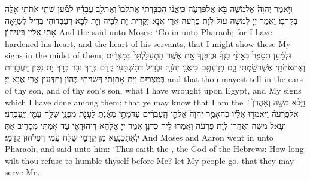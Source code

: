 \newperek
{}
{וַיֹּ֤אמֶר יְהֹוָה֙ אֶל\maqqaf מֹשֶׁ֔ה בֹּ֖א אֶל\maqqaf פַּרְעֹ֑ה כִּֽי\maqqaf אֲנִ֞י הִכְבַּ֤דְתִּי אֶת\maqqaf לִבּוֹ֙ וְאֶת\maqqaf לֵ֣ב עֲבָדָ֔יו לְמַ֗עַן שִׁתִ֛י אֹתֹתַ֥י אֵ֖לֶּה בְּקִרְבּֽוֹ׃}
{וַאֲמַר יְיָ לְמֹשֶׁה עוֹל לְוָת פַּרְעֹה אֲרֵי אֲנָא יַקַּרִית יָת לִבֵּיהּ וְיָת לִבָּא דְּעַבְדּוֹהִי בְּדִיל לְשַׁוָּאָה אָתַי אִלֵּין בֵּינֵיהוֹן׃}
{And the \lord\space said unto Moses: ‘Go in unto Pharaoh; for I have hardened his heart, and the heart of his servants, that I might show these My signs in the midst of them;}{}
{וּלְמַ֡עַן תְּסַפֵּר֩ בְּאׇזְנֵ֨י בִנְךָ֜ וּבֶן\maqqaf בִּנְךָ֗ אֵ֣ת אֲשֶׁ֤ר הִתְעַלַּ֙לְתִּי֙ בְּמִצְרַ֔יִם וְאֶת\maqqaf אֹתֹתַ֖י אֲשֶׁר\maqqaf שַׂ֣מְתִּי בָ֑ם וִֽידַעְתֶּ֖ם כִּי\maqqaf אֲנִ֥י יְהֹוָֽה׃}
{וּבְדִיל דְּתִשְׁתַּעֵי קֳדָם בְּרָךְ וּבַר בְּרָךְ יָת נִסִּין דַּעֲבַדִית בְּמִצְרַיִם וְיָת אָתְוָתַי דְּשַׁוִּיתִי בְּהוֹן וְתִדְּעוּן אֲרֵי אֲנָא יְיָ׃}
{and that thou mayest tell in the ears of thy son, and of thy son’s son, what I have wrought upon Egypt, and My signs which I have done among them; that ye may know that I am the \lord.’}{}
{וַיָּבֹ֨א מֹשֶׁ֣ה וְאַהֲרֹן֮ אֶל\maqqaf פַּרְעֹה֒ וַיֹּאמְר֣וּ אֵלָ֗יו כֹּֽה\maqqaf אָמַ֤ר יְהֹוָה֙ אֱלֹהֵ֣י הָֽעִבְרִ֔ים עַד\maqqaf מָתַ֣י מֵאַ֔נְתָּ לֵעָנֹ֖ת מִפָּנָ֑י שַׁלַּ֥ח עַמִּ֖י וְיַֽעַבְדֻֽנִי׃}
{וְעָאל מֹשֶׁה וְאַהֲרֹן לְוָת פַּרְעֹה וַאֲמַרוּ לֵיהּ כִּדְנָן אֲמַר יְיָ אֱלָהָא דִּיהוּדָאֵי עַד אִמַּתִּי מְסָרֵיב אַתְּ לְאִתְכְּנָעָא מִן קֳדָמָי שַׁלַּח עַמִּי וְיִפְלְחוּן קֳדָמָי׃}
{And Moses and Aaron went in unto Pharaoh, and said unto him: ‘Thus saith the \lord, the God of the Hebrews: How long wilt thou refuse to humble thyself before Me? let My people go, that they may serve Me.}{}
